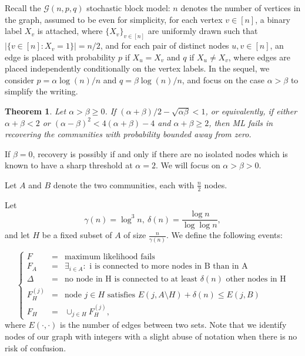 \documentclass[english]{article}
\newtheorem{theorem}{Theorem}
\newcommand{\1}{\textbf{1}}
\begin{document}
Recall the $\mathcal{G}(n,p,q)$ stochastic block model: $n$ denotes the number of vertices in the graph, assumed to be even for simplicity, for each vertex $v \in [n]$, a binary label $X_v$ is attached, where $\{X_v\}_{v \in [n]}$ are uniformly drawn such that $|\{v \in [n] : X_v =1\}|=n/2$, and for each pair of distinct nodes $u,v \in [n]$, an edge is placed with probability $p$ if $X_u=X_v$ and $q$ if $X_u \neq X_v$, where edges are placed independently conditionally on the vertex labels. In the sequel, we consider $p=\alpha \log(n)/n$ and $q=\beta \log(n)/n$, and focus on the case $\alpha > \beta$ to simplify the writing. 


\begin{theorem}\label{theorem:mainlowerbound}
Let $\alpha>\beta \geq 0$. If $(\alpha + \beta)/2 - \sqrt{\alpha \beta} < 1$, or equivalently, if either $\alpha + \beta < 2$ or $(\alpha-\beta)^2 < 4(\alpha+\beta) - 4$ and $\alpha + \beta \geq 2$, then ML fails in recovering the communities with probability bounded away from zero.
\end{theorem}

If $\beta = 0$, recovery is possibly if and only if there are no isolated nodes which is known to have a sharp threshold at $\alpha=2$. We will focus on $\alpha>\beta>0$.

Let $A$ and $B$ denote the two communities, each with $\frac{n}2$ nodes. 

Let
$$\gamma(n) = \log^3 n, \ \delta(n) = \frac{\log n}{\log \log n},$$
and let $H$ be a fixed subset of $A$ of size $\frac{n}{\gamma(n)}$.
We define the following events:

\begin{equation}\label{def:events}
\left\{
\begin{array}{ccl}
F & = & \text{maximum likelihood fails} \\
F_A & = & \exists_{i\in A} : \text{ i is connected to more nodes in B than in A} \\
\Delta & = & \text{no node in H is connected to at least }\delta(n) \text{ other nodes in H} \\
F_H^{(j)} & = & \text{node }j\in H \text{ satisfies } E(j,A\setminus H) +\delta(n) \leq E(j,B) \\
F_H & = & \cup_{j\in H} F_H^{(j)},
\end{array}
\right.
\end{equation}
where $E(\cdot,\cdot)$ is the number of edges between two sets. Note that we identify nodes of our graph with integers with a slight abuse of notation when there is no risk of confusion.
\end{document}
